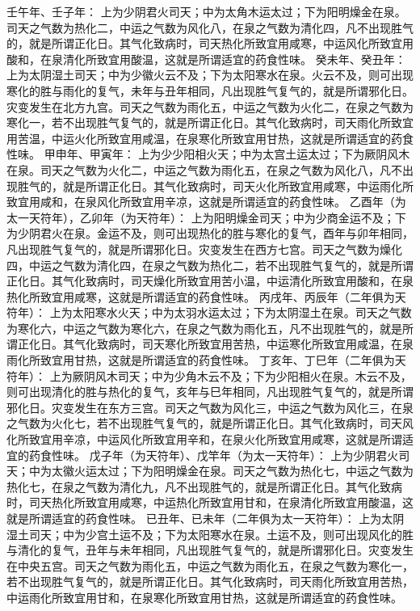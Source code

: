\documentclass[a4paper,12pt,UTF8,twoside]{ctexbook}
\begin{document}
壬午年、壬子年：
上为少阴君火司天；中为太角木运太过；下为阳明燥金在泉。司天之气数为热化二，中运之气数为风化八，在泉之气数为清化四，凡不出现胜气的，就是所谓正化日。其气化致病时，司天热化所致宜用咸寒，中运风化所致宜用酸和，在泉清化所致宜用酸温，这就是所谓适宜的药食性味。
癸未年、癸丑年：
上为太阴湿土司天；中为少徽火云不及；下为太阳寒水在泉。火云不及，则可出现寒化的胜与雨化的复气，未年与丑年相同，凡出现胜气复气的，就是所谓邪化日。灾变发生在北方九宫。司天之气数为雨化五，中运之气数为火化二，在泉之气数为寒化一，若不出现胜气复气的，就是所谓正化日。其气化致病时，司天雨化所致宜用苦温，中运火化所致宜用咸温，在泉寒化所致宜用甘热，这就是所谓适宜的药食性味。
甲申年、甲寅年：
上为少少阳相火天；中为太宫土运太过；下为厥阴风木在泉。司天之气数为火化二，中运之气数为雨化五，在泉之气数为风化八，凡不出现胜气的，就是所谓正化日。其气化致病时，司天火化所致宜用咸寒，中运雨化所致宜用咸和，在泉风化所致宜用辛凉，这就是所谓适宜的药食性味。
乙酉年（为太一天符年），乙卯年（为天符年）：
上为阳明燥金司天；中为少商金运不及；下为少阴君火在泉。金运不及，则可出现热化的胜与寒化的复气，酉年与卯年相同，凡出现胜气复气的，就是所谓邪化日。灾变发生在西方七宫。司天之气数为燥化四，中运之气数为清化四，在泉之气数为热化二，若不出现胜气复气的，就是所谓正化日。其气化致病时，司天燥化所致宜用苦小温，中运清化所致宜用酸和，在泉热化所致宜用咸寒，这就是所谓适宜的药食性味。
丙戌年、丙辰年（二年俱为天符年）：
上为太阳寒水火天；中为太羽水运太过；下为太阴湿土在泉。司天之气数为寒化六，中运之气数为寒化六，在泉之气数为雨化五，凡不出现胜气的，就是所谓正化日。其气化致病时，司天寒化所致宜用苦热，中运寒化所致宜用咸温，在泉雨化所致宜用甘热，这就是所谓适宜的药食性味。
丁亥年、丁巳年（二年俱为天符年）：
上为厥阴风木司天；中为少角木云不及；下为少阳相火在泉。木云不及，则可出现清化的胜与热化的复气，亥年与巳年相同，凡出现胜气复气的，就是所谓邪化日。灾变发生在东方三宫。司天之气数为风化三，中运之气数为风化三，在泉之气数为火化七，若不出现胜气复气的，就是所谓正化日。其气化致病时，司天风化所致宜用辛凉，中运风化所致宜用辛和，在泉火化所致宜用咸寒，这就是所谓适宜的药食性味。
戊子年（为天符年）、戊竿年（为太一天符年）：
上为少阴君火司天；中为太徽火运太过；下为阳明燥金在泉。司天之气数为热化七，中运之气数为热化七，在泉之气数为清化九，凡不出现胜气的，就是所谓正化日。其气化致病时，司天热化所致宜用咸寒，中运热化所致宜用甘和，在泉清化所致宜用酸温，这就是所谓适宜的药食性味。
已丑年、已未年（二年俱为太一天符年）：
上为太阴湿土司天；中为少宫土运不及；下为太阳寒水在泉。土运不及，则可出现风化的胜与清化的复气，丑年与未年相同，凡出现胜气复气的，就是所谓邪化日。灾变发生在中央五宫。司天之气数为雨化五，中运之气数为雨化五，在泉之气数为寒化一，若不出现胜气复气的，就是所谓正化日。其气化致病时，司天雨化所致宜用苦热，中运雨化所致宜用甘和，在泉寒化所致宜用甘热，这就是所谓适宜的药食性味。
\end{document}
